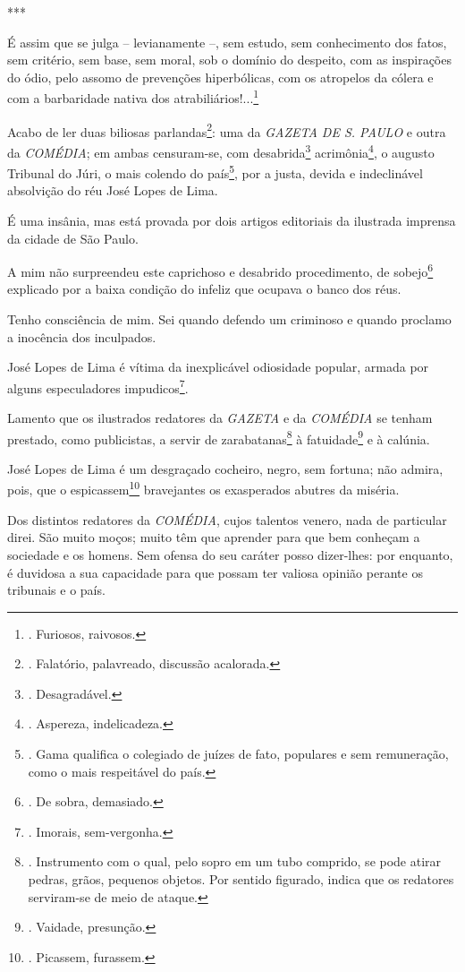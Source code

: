 ***

É assim que se julga -- levianamente --, sem estudo, sem conhecimento
dos fatos, sem critério, sem base, sem moral, sob o domínio do despeito,
com as inspirações do ódio, pelo assomo de prevenções hiperbólicas, com
os atropelos da cólera e com a barbaridade nativa dos
atrabiliários!...\footnote{. Furiosos, raivosos.}

Acabo de ler duas biliosas parlandas\footnote{. Falatório, palavreado,
  discussão acalorada.}: uma da \emph{GAZETA DE S. PAULO} e outra da
\emph{COMÉDIA}; em ambas censuram-se, com desabrida\footnote{.
  Desagradável.} acrimônia\footnote{. Aspereza, indelicadeza.}, o
augusto Tribunal do Júri, o mais colendo do país\footnote{. Gama
  qualifica o colegiado de juízes de fato, populares e sem remuneração,
  como o mais respeitável do país.}, por a justa, devida e indeclinável
absolvição do réu José Lopes de Lima.

É uma insânia, mas está provada por dois artigos editoriais da ilustrada
imprensa da cidade de São Paulo.

A mim não surpreendeu este caprichoso e desabrido procedimento, de
sobejo\footnote{. De sobra, demasiado.} explicado por a baixa condição
do infeliz que ocupava o banco dos réus.

Tenho consciência de mim. Sei quando defendo um criminoso e quando
proclamo a inocência dos inculpados.

José Lopes de Lima é vítima da inexplicável odiosidade popular, armada
por alguns especuladores impudicos\footnote{. Imorais, sem-vergonha.}.

Lamento que os ilustrados redatores da \emph{GAZETA} e da \emph{COMÉDIA}
se tenham prestado, como publicistas, a servir de zarabatanas\footnote{.
  Instrumento com o qual, pelo sopro em um tubo comprido, se pode atirar
  pedras, grãos, pequenos objetos. Por sentido figurado, indica que os
  redatores serviram-se de meio de ataque.} à fatuidade\footnote{.
  Vaidade, presunção.} e à calúnia.

José Lopes de Lima é um desgraçado cocheiro, negro, sem fortuna; não
admira, pois, que o espicassem\footnote{. Picassem, furassem.}
bravejantes os exasperados abutres da miséria.

Dos distintos redatores da \emph{COMÉDIA}, cujos talentos venero, nada
de particular direi. São muito moços; muito têm que aprender para que
bem conheçam a sociedade e os homens. Sem ofensa do seu caráter posso
dizer-lhes: por enquanto, é duvidosa a sua capacidade para que possam
ter valiosa opinião perante os tribunais e o país.

